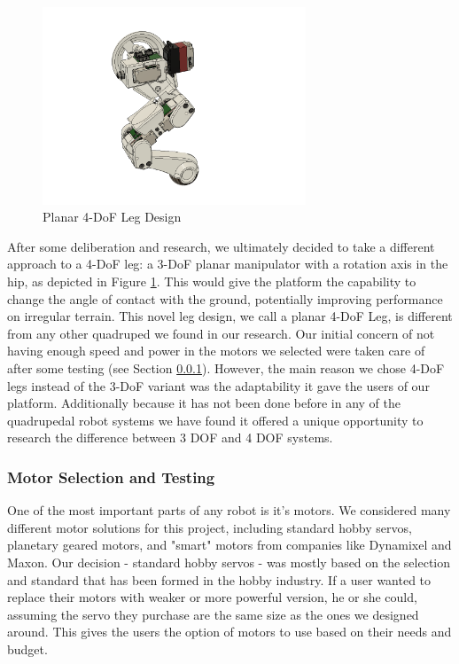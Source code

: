                 \begin{figure}[H]
                    \centering
                    \includegraphics[width=0.7\textwidth]{figures/4dof.png}
                    \caption{Planar 4-DoF Leg Design}
                    \label{fig:4DoFDesign}
                \end{figure}
                
            After some deliberation and research, we ultimately decided to take a different approach to a 4-DoF leg: a 3-DoF planar manipulator with a rotation axis in the hip, as depicted in Figure \ref{fig:4DoFDesign}. This would give the platform the capability to change the angle of contact with the ground, potentially improving performance on irregular terrain. This novel leg design, we call a planar 4-DoF Leg, is different from any other quadruped we found in our research. Our initial concern of not having enough speed and power in the motors we selected were taken care of after some testing (see Section \ref{subsubsec:MotorSelection}). However, the main reason we chose 4-DoF legs instead of the 3-DoF variant was the adaptability it gave the users of our platform. Additionally because it has not been done before in any of the quadrupedal robot systems we have found it offered a unique opportunity to research the difference between 3 DOF and 4 DOF systems. 
            
        \subsubsection{Motor Selection and Testing}\label{subsubsec:MotorSelection}
        One of the most important parts of any robot is it's motors. We considered many different motor solutions for this project, including standard hobby servos, planetary geared motors, and "smart" motors from companies like Dynamixel and Maxon. Our decision - standard hobby servos - was mostly based on the selection and standard that has been formed in the hobby industry. If a user wanted to replace their motors with weaker or more powerful version, he or she could, assuming the servo they purchase are the same size as the ones we designed around. This gives the users the option of motors to use based on their needs and budget. 
